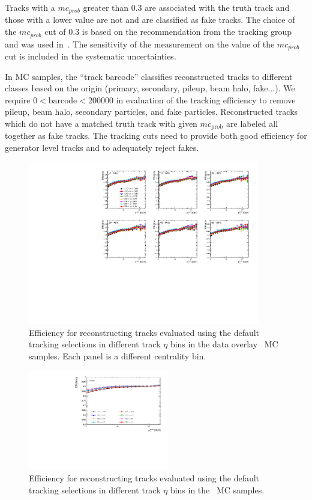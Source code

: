Tracks with a $mc_{prob}$ greater than 0.3 are associated with the truth track and those with a lower value are not and are classified as fake tracks.
The choice of the $mc_{prob}$ cut of 0.3 is based on the recommendation from the tracking group and was used in~\cite{201865}.
The sensitivity of the measurement on the value of the $mc_{prob}$ cut is included in the systematic uncertainties.

In MC samples, the ``track barcode'' classifies reconstructed tracks to different classes based on the origin (primary, secondary, pileup, beam halo, fake...).
 We require $0 < \mathrm{barcode} < 200000$ in evaluation of the tracking efficiency to remove pileup, beam halo, secondary particles, and fake particles.
 Reconstructed tracks which do not have a matched truth track with given $mc_{\mathrm{prob}}$ are labeled all together as fake tracks.
The tracking cuts need to provide both good efficiency for generator level tracks and to adequately reject fakes.

\begin{figure}[ht]
   \centerline{
      \includegraphics[width=0.9\textwidth]{figures/main/corrections/eff_cent_trketa_PbPb_ppTight.pdf}
   }
   \caption{Efficiency for reconstructing tracks evaluated using the default tracking selections in different track $\eta$ bins in the data overlay \pbpb\ MC samples.
Each panel is a different centrality bin.}
   \label{fig:pbpbeffdefault_final}
\end{figure}

\begin{figure}[ht]
   \centerline{
      \includegraphics[width=0.55\textwidth]{figures/main/corrections/eff_cent_trketa_pp_ppTight.pdf}
   }
   \caption{Efficiency for reconstructing tracks evaluated using the default tracking selections in different track $\eta$ bins in the \pp\ MC samples.}
   \label{fig:ppeffdefault_final}
\end{figure}

